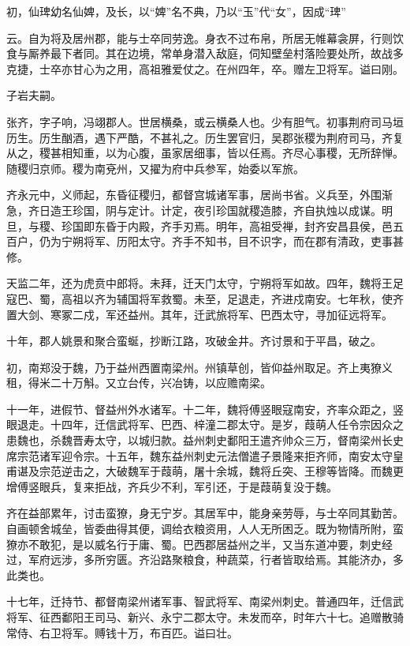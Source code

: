 \documentclass[12pt,UTF8]{ctexbook}
\begin{document}
初，仙琕幼名仙婢，及长，以“婢”名不典，乃以“玉”代“女”，因成“琕”

云。自为将及居州郡，能与士卒同劳逸。身衣不过布帛，所居无帷幕衾屏，行则饮食与厮养最下者同。其在边境，常单身潜入敌庭，伺知壁垒村落险要处所，故战多克捷，士卒亦甘心为之用，高祖雅爱仗之。在州四年，卒。赠左卫将军。谥曰刚。

子岩夫嗣。

张齐，字子响，冯翊郡人。世居横桑，或云横桑人也。少有胆气。初事荆府司马垣历生。历生酗酒，遇下严酷，不甚礼之。历生罢官归，吴郡张稷为荆府司马，齐复从之，稷甚相知重，以为心腹，虽家居细事，皆以任焉。齐尽心事稷，无所辞惮。随稷归京师。稷为南兗州，又擢为府中兵参军，始委以军旅。

齐永元中，义师起，东昏征稷归，都督宫城诸军事，居尚书省。义兵至，外围渐急，齐日造王珍国，阴与定计。计定，夜引珍国就稷造膝，齐自执烛以成谋。明旦，与稷、珍国即东昏于内殿，齐手刃焉。明年，高祖受禅，封齐安昌县侯，邑五百户，仍为宁朔将军、历阳太守。齐手不知书，目不识字，而在郡有清政，吏事甚修。

天监二年，还为虎贲中郎将。未拜，迁天门太守，宁朔将军如故。四年，魏将王足寇巴、蜀，高祖以齐为辅国将军救蜀。未至，足退走，齐进戍南安。七年秋，使齐置大剑、寒冢二戍，军还益州。其年，迁武旅将军、巴西太守，寻加征远将军。

十年，郡人姚景和聚合蛮蜒，抄断江路，攻破金井。齐讨景和于平昌，破之。

初，南郑没于魏，乃于益州西置南梁州。州镇草创，皆仰益州取足。齐上夷獠义租，得米二十万斛。又立台传，兴冶铸，以应赡南梁。

十一年，进假节、督益州外水诸军。十二年，魏将傅竖眼寇南安，齐率众距之，竖眼退走。十四年，迁信武将军、巴西、梓潼二郡太守。是岁，葭萌人任令宗因众之患魏也，杀魏晋寿太守，以城归款。益州刺史鄱阳王遣齐帅众三万，督南梁州长史席宗范诸军迎令宗。十五年，魏东益州刺史元法僧遣子景隆来拒齐师，南安太守皇甫谌及宗范逆击之，大破魏军于葭萌，屠十余城，魏将丘突、王穆等皆降。而魏更增傅竖眼兵，复来拒战，齐兵少不利，军引还，于是葭萌复没于魏。

齐在益部累年，讨击蛮獠，身无宁岁。其居军中，能身亲劳辱，与士卒同其勤苦。自画顿舍城垒，皆委曲得其便，调给衣粮资用，人人无所困乏。既为物情所附，蛮獠亦不敢犯，是以威名行于庸、蜀。巴西郡居益州之半，又当东道冲要，刺史经过，军府远涉，多所穷匮。齐沿路聚粮食，种蔬菜，行者皆取给焉。其能济办，多此类也。

十七年，迁持节、都督南梁州诸军事、智武将军、南梁州刺史。普通四年，迁信武将军、征西鄱阳王司马、新兴、永宁二郡太守。未发而卒，时年六十七。追赠散骑常侍、右卫将军。赙钱十万，布百匹。谥曰壮。
\end{document}
